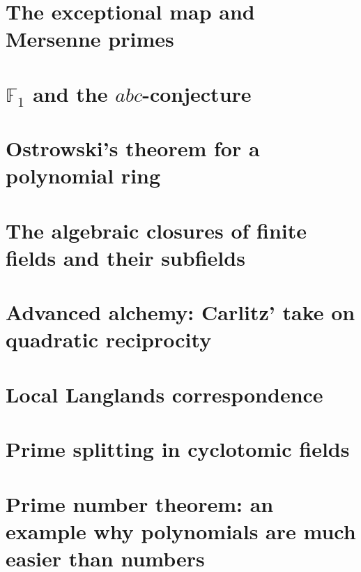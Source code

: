 \documentclass[a4paper]{memoir}
\begin{document}
\section{The exceptional map and Mersenne primes}


\section{\texorpdfstring{$\mathbb{F}_1$}{F\_un} and the \texorpdfstring{$abc$}{abc}-conjecture}


\section{Ostrowski's theorem for a polynomial ring}


\section{The algebraic closures of finite fields and their subfields}


\section{Advanced alchemy: Carlitz' take on quadratic reciprocity}


\section{Local Langlands correspondence}


\section{Prime splitting in cyclotomic fields}


\section{Prime number theorem: an example why polynomials are much easier than numbers}




\end{document}
